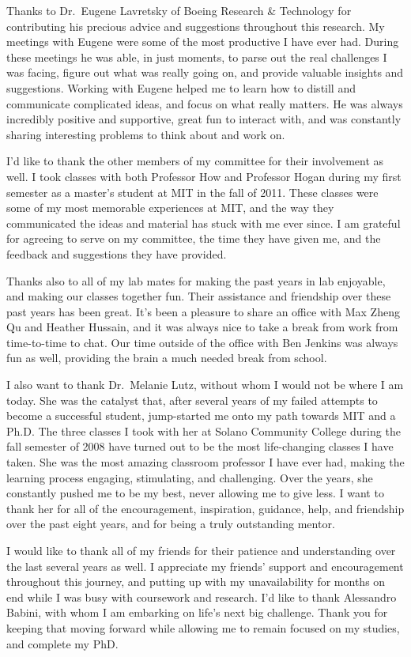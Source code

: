 Thanks to Dr.\ Eugene Lavretsky of Boeing Research \& Technology for contributing his precious advice and suggestions throughout this research.
My meetings with Eugene were some of the most productive I have ever had.
During these meetings he was able, in just moments, to parse out the real challenges I was facing, figure out what was really going on, and provide valuable insights and suggestions.
Working with Eugene helped me to learn how to distill and communicate complicated ideas, and focus on what really matters.
He was always incredibly positive and supportive, great fun to interact with, and was constantly sharing interesting problems to think about and work on.

I'd like to thank the other members of my committee for their involvement as well.
I took classes with both Professor How and Professor Hogan during my first semester as a master's student at MIT in the fall of 2011.
These classes were some of my most memorable experiences at MIT, and the way they communicated the ideas and material has stuck with me ever since.
I am grateful for agreeing to serve on my committee, the time they have given me, and the feedback and suggestions they have provided.

Thanks also to all of my lab mates for making the past years in lab enjoyable, and making our classes together fun.
Their assistance and friendship over these past years has been great.
It's been a pleasure to share an office with Max Zheng Qu and Heather Hussain, and it was always nice to take a break from work from time-to-time to chat.
Our time outside of the office with Ben Jenkins was always fun as well, providing the brain a much needed break from school.

I also want to thank Dr.\ Melanie Lutz, without whom I would not be where I am today.
She was the catalyst that, after several years of my failed attempts to become a successful student, jump-started me onto my path towards MIT and a Ph.D.
The three classes I took with her at Solano Community College during the fall semester of 2008 have turned out to be the most life-changing classes I have taken.
She was the most amazing classroom professor I have ever had, making the learning process engaging, stimulating, and challenging.
Over the years, she constantly pushed me to be my best, never allowing me to give less.
I want to thank her for all of the encouragement, inspiration, guidance, help, and friendship over the past eight years, and for being a truly outstanding mentor.

I would like to thank all of my friends for their patience and understanding over the last several years as well.
I appreciate my friends' support and encouragement throughout this journey, and putting up with my unavailability for months on end while I was busy with coursework and research.
I'd like to thank Alessandro Babini, with whom I am embarking on life's next big challenge.
Thank you for keeping that moving forward while allowing me to remain focused on my studies, and complete my PhD.


